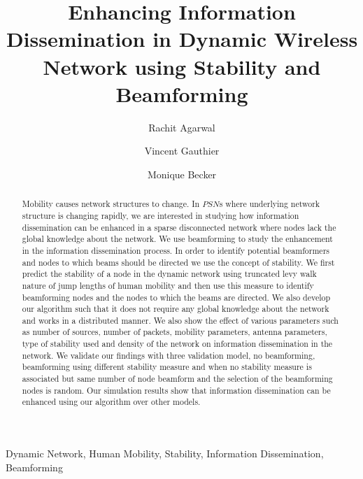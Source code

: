 \documentclass[preprint, twocolumn,5p]{elsarticle}
\begin{document}
\title{Enhancing Information Dissemination in Dynamic Wireless Network using Stability and Beamforming}

\author[TSP]{Rachit Agarwal}
\author[TSP]{Vincent Gauthier}
\author[TSP]{Monique Becker}

\address[TSP]{Telecom SudParis, 9 Rue Charles Fourier, Evry, 91011, France}


\begin{abstract}
Mobility causes network structures to change. In $PSN$s where underlying network structure is changing rapidly, we are interested in studying how information dissemination can be enhanced in a sparse disconnected network where nodes lack the global knowledge about the network. We use beamforming to study the enhancement in the information dissemination process. In order to identify potential beamformers and nodes to which beams should be directed we use the concept of stability. We first predict the stability of a node in the dynamic network using truncated levy walk nature of jump lengths of human mobility and then use this measure to identify beamforming nodes and the nodes to which the beams are directed. We also develop our algorithm such that it does not require any global knowledge about the network and works in a distributed manner. We also show the effect of various parameters such as number of sources, number of packets, mobility parameters, antenna parameters, type of stability used and density of the network on information dissemination in the network. We validate our findings with three validation model, no beamforming, beamforming using different stability measure and when no stability measure is associated but same number of node beamform and the selection of the beamforming nodes is random. Our simulation results show that information dissemination can be enhanced using our algorithm over other models.
\end{abstract}

\begin{keyword}
Dynamic Network, Human Mobility, Stability, Information Dissemination, Beamforming
\end{keyword}

\maketitle
\end{document}
